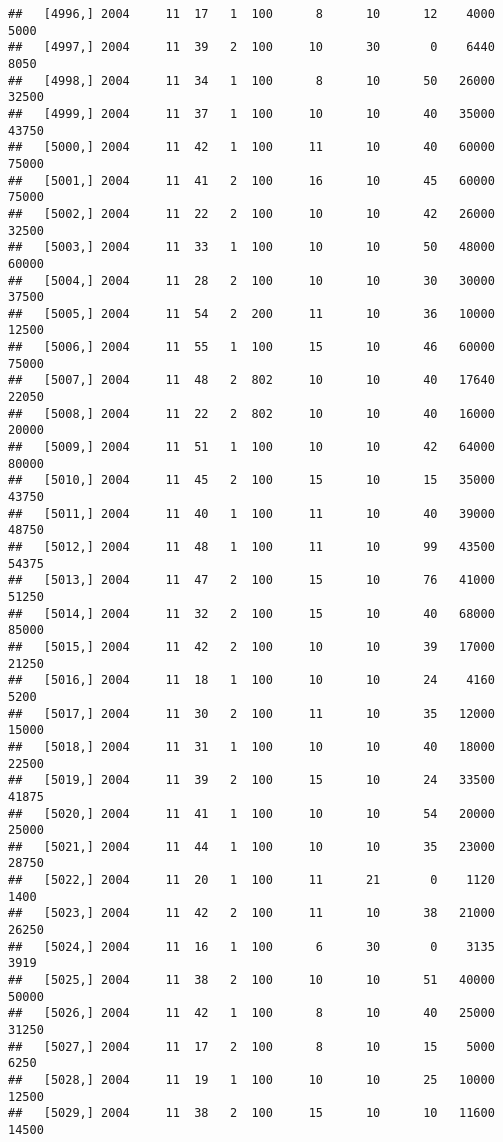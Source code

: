 \documentclass{article}\usepackage[]{graphicx}\usepackage[]{color}
\makeatletter
\newenvironment{kframe}{%
 \def\at@end@of@kframe{}%
 \ifinner\ifhmode%
  \def\at@end@of@kframe{\end{minipage}}%
  \begin{minipage}{\columnwidth}%
 \fi\fi%
 \def\FrameCommand##1{\hskip\@totalleftmargin \hskip-\fboxsep
 \colorbox{shadecolor}{##1}\hskip-\fboxsep
     \hskip-\linewidth \hskip-\@totalleftmargin \hskip\columnwidth}%
 \MakeFramed {\advance\hsize-\width
   \@totalleftmargin\z@ \linewidth\hsize
   \@setminipage}}%
 {\par\unskip\endMakeFramed%
 \at@end@of@kframe}
\newenvironment{knitrout}{}{} %
\makeatother
\begin{document}
\begin{knitrout}
\begin{kframe}
\begin{verbatim}
##   [4996,] 2004     11  17   1  100      8      10      12    4000    5000
##   [4997,] 2004     11  39   2  100     10      30       0    6440    8050
##   [4998,] 2004     11  34   1  100      8      10      50   26000   32500
##   [4999,] 2004     11  37   1  100     10      10      40   35000   43750
##   [5000,] 2004     11  42   1  100     11      10      40   60000   75000
##   [5001,] 2004     11  41   2  100     16      10      45   60000   75000
##   [5002,] 2004     11  22   2  100     10      10      42   26000   32500
##   [5003,] 2004     11  33   1  100     10      10      50   48000   60000
##   [5004,] 2004     11  28   2  100     10      10      30   30000   37500
##   [5005,] 2004     11  54   2  200     11      10      36   10000   12500
##   [5006,] 2004     11  55   1  100     15      10      46   60000   75000
##   [5007,] 2004     11  48   2  802     10      10      40   17640   22050
##   [5008,] 2004     11  22   2  802     10      10      40   16000   20000
##   [5009,] 2004     11  51   1  100     10      10      42   64000   80000
##   [5010,] 2004     11  45   2  100     15      10      15   35000   43750
##   [5011,] 2004     11  40   1  100     11      10      40   39000   48750
##   [5012,] 2004     11  48   1  100     11      10      99   43500   54375
##   [5013,] 2004     11  47   2  100     15      10      76   41000   51250
##   [5014,] 2004     11  32   2  100     15      10      40   68000   85000
##   [5015,] 2004     11  42   2  100     10      10      39   17000   21250
##   [5016,] 2004     11  18   1  100     10      10      24    4160    5200
##   [5017,] 2004     11  30   2  100     11      10      35   12000   15000
##   [5018,] 2004     11  31   1  100     10      10      40   18000   22500
##   [5019,] 2004     11  39   2  100     15      10      24   33500   41875
##   [5020,] 2004     11  41   1  100     10      10      54   20000   25000
##   [5021,] 2004     11  44   1  100     10      10      35   23000   28750
##   [5022,] 2004     11  20   1  100     11      21       0    1120    1400
##   [5023,] 2004     11  42   2  100     11      10      38   21000   26250
##   [5024,] 2004     11  16   1  100      6      30       0    3135    3919
##   [5025,] 2004     11  38   2  100     10      10      51   40000   50000
##   [5026,] 2004     11  42   1  100      8      10      40   25000   31250
##   [5027,] 2004     11  17   2  100      8      10      15    5000    6250
##   [5028,] 2004     11  19   1  100     10      10      25   10000   12500
##   [5029,] 2004     11  38   2  100     15      10      10   11600   14500

\end{verbatim}
\end{kframe}
\end{knitrout}
\end{document}
